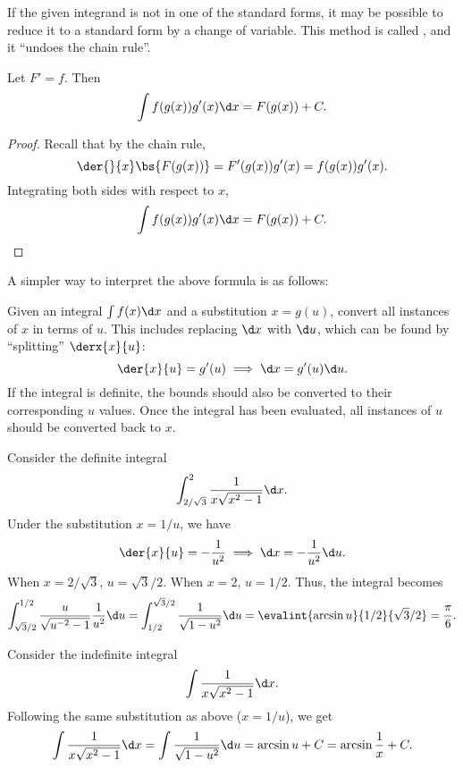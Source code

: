 If the given integrand is not in one of the standard forms, it may be possible to reduce it to a standard form by a change of variable. This method is called , and it ``undoes the chain rule''.

\begin{proposition}
    Let $F' = f$. Then \[\int f(g(x)) g'(x) \d x = F(g(x)) + C.\]
\end{proposition}
\begin{proof}
    Recall that by the chain rule, \[\der{}{x} \bs{F(g(x))} = F'(g(x)) g'(x) = f(g(x)) g'(x).\] Integrating both sides with respect to $x$, \[\int f(g(x)) g'(x) \d x = F(g(x)) + C.\]
\end{proof}

A simpler way to interpret the above formula is as follows:

\begin{recipe}
    Given an integral $\int f(x) \d x$ and a substitution $x = g(u)$, convert all instances of $x$ in terms of $u$. This includes replacing $\d x$ with $\d u$, which can be found by ``splitting'' $\derx{x}{u}$: \[\der{x}{u} = g'(u) \implies \d x = g'(u) \d u.\] If the integral is definite, the bounds should also be converted to their corresponding $u$ values. Once the integral has been evaluated, all instances of $u$ should be converted back to $x$.
\end{recipe}

\begin{example}
    Consider the definite integral \[\int_{2/\sqrt3}^2 \frac1{x\sqrt{x^2 - 1}} \d x.\] Under the substitution $x = 1/u$, we have \[\der{x}{u} = -\frac1{u^2} \implies \d x = -\frac1{u^2} \d u.\] When $x = 2/\sqrt 3$, $u = \sqrt3/2$. When $x = 2$, $u = 1/2$. Thus, the integral becomes \[\int_{\sqrt3 / 2}^{1/2} \frac{u}{\sqrt{u^{-2} - 1}} \frac1{u^2} \d u = \int_{1/2}^{\sqrt3 /2} \frac1{\sqrt{1 - u^2}} \d u = \evalint{\arcsin u}{1/2}{\sqrt3 /2} = \frac\pi6.\]
\end{example}

\begin{example}
    Consider the indefinite integral \[\int \frac1{x\sqrt{x^2 - 1}} \d x.\] Following the same substitution as above ($x = 1/u$), we get \[\int \frac1{x\sqrt{x^2 - 1}} \d x = \int \frac1{\sqrt{1 - u^2}} \d u = \arcsin u + C = \arcsin \frac1x + C.\] 
\end{example}

